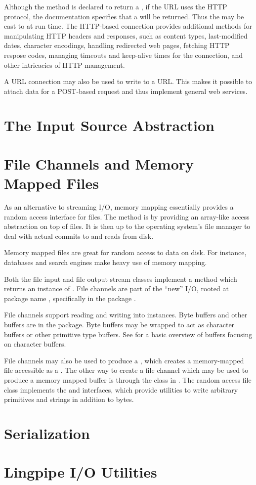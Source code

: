 Although the  method  is declared to
return a , if the URL uses the HTTP protocol, the
documentation specifies that a  will be
returned.  Thus the  may be cast to
 at run time.  The HTTP-based connection
provides additional methods for manipulating HTTP headers and
responses, such as content types, last-modified dates, character
encodings, handling redirected web pages, fetching HTTP respose codes,
managing timeouts and keep-alive times for the connection, and other
intricacies of HTTP management.

A URL connection may also be used to write to a URL.  This makes it
possible to attach data for a POST-based request and thus implement
general web services.


\section{The Input Source Abstraction}


\section{File Channels and Memory Mapped Files}

As an alternative to streaming I/O, memory mapping essentially
provides a random access interface for files.  The method is by
providing an array-like access abstraction on top of files.  It is
then up to the operating system's file manager to deal with actual
commits to and reads from disk.

Memory mapped files are great for random access to data on disk.  For
instance, databases and search engines make heavy use of memory
mapping.

Both the file input and file output stream classes implement a
 method which returns an instance of
.  File channels are part of the ``new'' I/O,
rooted at package name , specifically in the
package .  

File channels support reading and writing into 
instances.  Byte buffers and other buffers are in the 
package.  Byte buffers may be wrapped to act as character buffers or
other primitive type buffers.  See  for a
basic overview of buffers focusing on character buffers.

File channels may also be used to produce a ,
which creates a memory-mapped file accessible as a .
The other way to create a file channel which may be used to produce a
memory mapped buffer is through the  class in
.  The random access file class implements the
 and  interfaces, which provide utilities
to write arbitrary primitives and strings in addition to bytes.

\section{Serialization}

\section{Lingpipe I/O Utilities}


